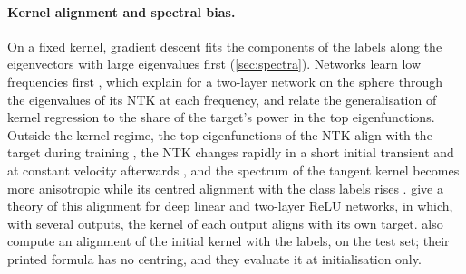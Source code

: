 \documentclass[a4paper,11pt]{article} %
\begin{document}
\paragraph{Kernel alignment and spectral bias.} On a fixed kernel, gradient
descent fits the components of the labels along the eigenvectors with large
eigenvalues first (\cref{sec:spectra}). Networks learn low frequencies first
\citep{rahamanSpectralBiasNeural2019}, which
\citet{basriConvergenceRateNeural2019} explain for a two-layer network on the
sphere through the eigenvalues of its NTK at each frequency, and
\citet{canatarSpectralBiasTaskModel2021} relate the generalisation of kernel
regression to the share of the target's power in the top eigenfunctions.
Outside the kernel regime, the top eigenfunctions of the NTK align with the
target during training \citep{kopitkovNeuralSpectrumAlignment2020}, the NTK
changes rapidly in a short initial transient and at constant velocity afterwards
\citep{fortDeepLearningKernel2020}, and the spectrum of the tangent kernel
becomes more anisotropic while its centred alignment with the class labels
rises \citep{baratinImplicitRegularizationNeural2021}.
 give a theory of this alignment for deep
linear and two-layer ReLU networks, in which, with several outputs, the kernel
of each output aligns with its own target.
 also compute an alignment of the
initial kernel with the labels, on the test set; their printed formula has no
centring, and they evaluate it at initialisation only.
\end{document}
